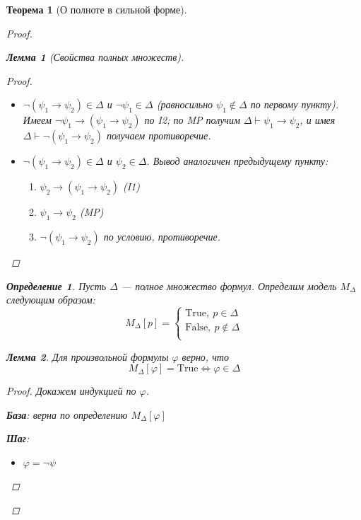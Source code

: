 \documentclass[12pt]{article}
\let\im\rightarrow
\let\n\neg
\let\nin\notin
\theoremstyle{definition}
\newtheorem{definition}{Определение}[section]
\theoremstyle{plain}
\newtheorem{theorem}{Теорема}[section]
\newtheorem{lemma}{Лемма}[section]
\theoremstyle{remark}
\begin{document}
\begin{theorem}[О полноте в сильной форме]
\begin{proof}
\begin{lemma}[Свойства полных множеств]
\begin{proof}
\begin{itemize}
\begin{itemize}
              \item $\n(\psi_1 \im \psi_2) \in \Delta$ и $\n \psi_1 \in
                \Delta$ (равносильно $\psi_1 \nin \Delta$ по первому
                пункту). Имеем $\n \psi_1 \im (\psi_1 \im \psi_2)$ по I2;
                по MP получим $\Delta \vdash \psi_1 \im \psi_2$, и
                имея $\Delta \vdash \n (\psi_1 \im \psi_2)$ получаем
                противоречие.

              \item $\n(\psi_1 \im \psi_2) \in \Delta$ и $\psi_2 \in
                \Delta$. Вывод аналогичен предыдущему пункту:
                \begin{enumerate}
                  \item $\psi_2 \im (\psi_1 \im \psi_2)$ (I1)

                  \item $\psi_1 \im \psi_2$ (MP)

                  \item $\n (\psi_1 \im \psi_2)$ по условию, противоречие.
                \end{enumerate}
            \end{itemize}
        \end{itemize}
      \end{proof}
    \end{lemma}

    \begin{definition}
      Пусть $\Delta$ --- полное множество формул. Определим модель
      $M_\Delta$ следующим образом:
      \[
        M_\Delta[p] =
        \begin{cases}
          \mathrm{True},\ p \in \Delta\\
          \mathrm{False},\ p \nin \Delta\\
        \end{cases}
      \]
    \end{definition}

    \begin{lemma}
      Для произвольной формулы $\varphi$ верно, что
      \[
        M_\Delta[\varphi] = \mathrm{True} \iff \varphi \in \Delta
      \]
      \begin{proof}
        Докажем индукцией по $\varphi$.

        \textbf{База}: верна по определению $M_\Delta[\varphi]$

        \textbf{Шаг}:
        \begin{itemize}
          \item $\varphi = \n \psi$


\end{itemize}
\end{proof}
\end{lemma}
\end{proof}
\end{theorem}
\end{document}
